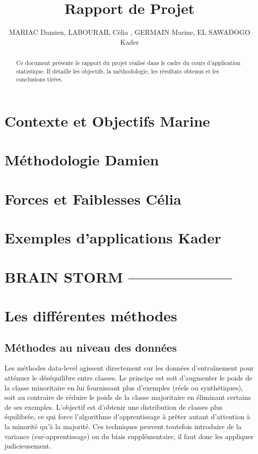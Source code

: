 \documentclass[a4paper,12pt]{article}
\title{Rapport de Projet}
\author{MARIAC Damien, LABOURAIL Célia , GERMAIN Marine,
EL SAWADOGO Kader}
\begin{document}
\maketitle

\begin{abstract}
Ce document présente le rapport du projet réalisé dans le cadre du cours d'application statistique. Il détaille les objectifs, la méthodologie, les résultats obtenus et les conclusions tirées.
\end{abstract}


\tableofcontents

\newpage

\section{Contexte et Objectifs Marine}

\newpage

\section{Méthodologie Damien}

\newpage

\section{Forces et Faiblesses Célia}

\newpage

\section{Exemples d'applications Kader}

\newpage

\section{BRAIN STORM --------------------}

\section{Les différentes méthodes}
\subsection{Méthodes au niveau des données}
Les méthodes data-level agissent directement sur les données d’entraînement pour atténuer le
déséquilibre entre classes. Le principe est soit d’augmenter le poids de la classe minoritaire en lui
fournissant plus d’exemples (réels ou synthétiques), soit au contraire de réduire le poids de la classe
majoritaire en éliminant certains de ses exemples. L’objectif est d’obtenir une distribution de classes
plus équilibrée, ce qui force l’algorithme d’apprentissage à prêter autant d’attention à la minorité qu’à la
majorité. Ces techniques peuvent toutefois introduire de la variance (sur-apprentissage) ou du
biais supplémentaire, il faut donc les appliquer judicieusement.
\end{document}
